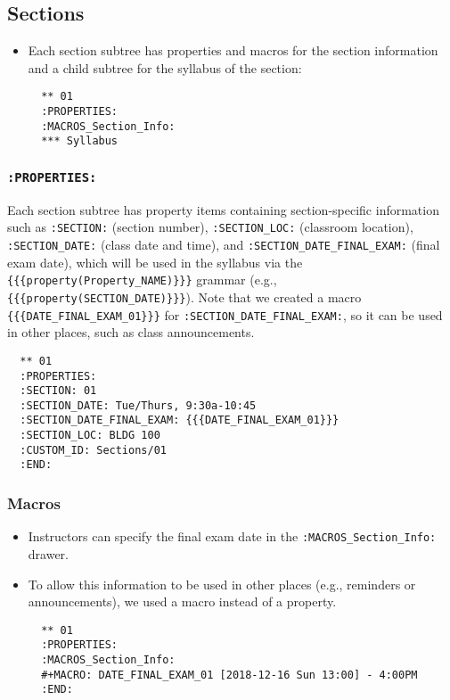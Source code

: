 \documentclass[10pt,article]{article}
\begin{document}
\subsection{Sections}
\label{sec:org20b9d5a}
\begin{itemize}
\item Each section subtree has properties and macros for the section
information and a child subtree for the syllabus of the section:

\begin{verbatim}
  ** 01
  :PROPERTIES:
  :MACROS_Section_Info:
  *** Syllabus
\end{verbatim}
\end{itemize}
\subsubsection{\texttt{:PROPERTIES:}}
\label{sec:org8396f39}
Each section subtree has property items containing section-specific
information such as \texttt{:SECTION:} (section number), \texttt{:SECTION\_LOC:}
(classroom location), \texttt{:SECTION\_DATE:} (class date and time), and
\texttt{:SECTION\_DATE\_FINAL\_EXAM:} (final exam date), which will be used in
the syllabus via the \texttt{\{\{\{property(Property\_NAME)\}\}\}} grammar (e.g.,
\texttt{\{\{\{property(SECTION\_DATE)\}\}\}}). Note that we created a macro
\texttt{\{\{\{DATE\_FINAL\_EXAM\_01\}\}\}} for \texttt{:SECTION\_DATE\_FINAL\_EXAM:}, so it can be
used in other places, such as class announcements.

\begin{verbatim}
  ** 01
  :PROPERTIES:
  :SECTION: 01
  :SECTION_DATE: Tue/Thurs, 9:30a-10:45
  :SECTION_DATE_FINAL_EXAM: {{{DATE_FINAL_EXAM_01}}}
  :SECTION_LOC: BLDG 100
  :CUSTOM_ID: Sections/01
  :END:
\end{verbatim}
\subsubsection{Macros}
\label{sec:org33022bc}
\begin{itemize}
\item Instructors can specify the final exam date in the
\texttt{:MACROS\_Section\_Info:} drawer.
\item To allow this information to be used in other places (e.g.,
reminders or announcements), we used a macro instead of a property.

\begin{verbatim}
  ** 01
  :PROPERTIES:
  :MACROS_Section_Info:
  #+MACRO: DATE_FINAL_EXAM_01 [2018-12-16 Sun 13:00] - 4:00PM
  :END:
\end{verbatim}
\end{itemize}
\end{document}
